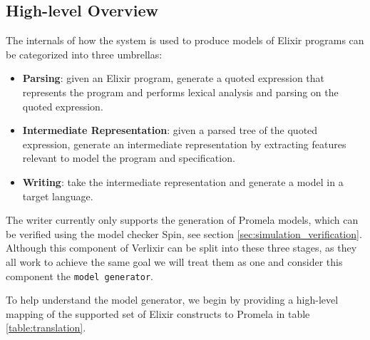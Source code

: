 \subsection{High-level Overview}
The internals of how the system is used to produce models of Elixir programs can be categorized into three umbrellas:
\begin{itemize}
    \item \textbf{Parsing}: given an Elixir program, generate a quoted expression that represents the program and performs lexical analysis and parsing on the quoted expression.
    \item \textbf{Intermediate Representation}: given a parsed tree of the quoted expression, generate an intermediate representation by extracting features relevant to model the program and specification.
    \item \textbf{Writing}: take the intermediate representation and generate a model in a target language.
\end{itemize} 
The writer currently only supports the generation of Promela models, which can be verified using the model checker Spin, see section \ref{sec:simulation_verification}. Although this component of Verlixir can be split into these three stages, as they all work to achieve the same goal we will treat them as one and consider this component the \texttt{model generator}. 
\par
To help understand the model generator, we begin by providing a high-level mapping of the supported set of Elixir constructs to Promela in table \ref{table:translation}.
\par
